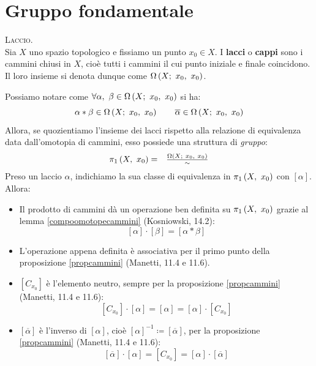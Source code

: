 \section{Gruppo fondamentale}
\begin{define}\textsc{Laccio.}\\
	Sia $X$ uno spazio topologico e fissiamo un punto $x_0\in X$. I \textbf{lacci} o \textbf{cappi} sono i cammini chiusi in $X$, cioè tutti i cammini il cui punto iniziale e finale coincidono. Il loro insieme si denota dunque come $\Omega\left(X;\ x_0,\ x_0\right)$.
\end{define}
\begin{observe}
	Possiamo notare come $\forall\alpha,\ \beta\in\inscam{X}{x_0}{x_0}$ si ha:
	\begin{equation*}
		\alpha\ast\beta\in\Omega\left(X;\ x_0,\ x_0\right)\qquad \overline{\alpha}\in\Omega\left(X;\ x_0,\ x_0\right)
	\end{equation*}
Allora, se quozientiamo l'insieme dei lacci rispetto alla relazione di equivalenza data dall'omotopia di cammini, esso possiede una struttura di \textit{gruppo}:
\begin{equation}
	\begin{array}{cc}
	\gruf{X}{x_0}=&\frac{\inscam{X}{x_0}{x_0}}{\sim}
	\end{array}	
\end{equation}
Preso un laccio $\alpha$, indichiamo la sua classe di equivalenza in $\gruf{X}{x_0}$ con $\left[\alpha\right]$. Allora:
\begin{itemize}
	\item Il prodotto di cammini dà un operazione ben definita su $\gruf{X}{x_0}$ grazie al lemma \ref{compoomotopecammini} (Kosniowski, 14.2):
	\begin{equation}
		\left[\alpha\right]\cdot\left[\beta\right]=\left[\alpha\ast\beta\right]
	\end{equation}
\item L'operazione appena definita è associativa per il primo punto della proposizione \ref{propcammini} (Manetti, 11.4 e 11.6).
\item $\left[C_{x_0}\right]$ è l'elemento neutro, sempre per la proposizione \ref{propcammini} (Manetti, 11.4 e 11.6):
\begin{equation}
	\left[C_{x_0}\right]\cdot\left[\alpha\right]=\left[\alpha\right]=\left[\alpha\right]\cdot\left[C_{x_0}\right]
\end{equation} 
\item $\left[\overline{\alpha}\right]$ è l'inverso di $\left[\alpha\right]$, cioè $\left[\alpha\right]^{-1}\coloneqq\left[\overline{\alpha}\right]$, per la proposizione \ref{propcammini} (Manetti, 11.4 e 11.6):
\begin{equation}
\left[\overline{\alpha}\right]\cdot\left[\alpha\right]=\left[C_{x_0}\right]=\left[\alpha\right]\cdot\left[\overline{\alpha}\right]
\end{equation}
\end{itemize}
\vspace{-6mm}
\end{observe}
